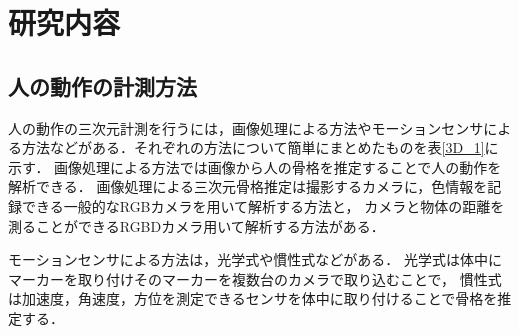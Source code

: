 \documentclass[titlepage]{jarticle}
\begin{document}
%
%
\section{研究内容}

%
%
\subsection{人の動作の計測方法}
%
人の動作の三次元計測を行うには，画像処理による方法やモーションセンサによる方法などがある．それぞれの方法について簡単にまとめたものを表\ref{3D_1}に示す．
画像処理による方法では画像から人の骨格を推定することで人の動作を解析できる．
画像処理による三次元骨格推定は撮影するカメラに，色情報を記録できる一般的なRGBカメラを用いて解析する方法と，
カメラと物体の距離を測ることができるRGBDカメラ用いて解析する方法がある．

モーションセンサによる方法は，光学式や慣性式などがある．
光学式は体中にマーカーを取り付けそのマーカーを複数台のカメラで取り込むことで，
慣性式は加速度，角速度，方位を測定できるセンサを体中に取り付けることで骨格を推定する．
\end{document}
